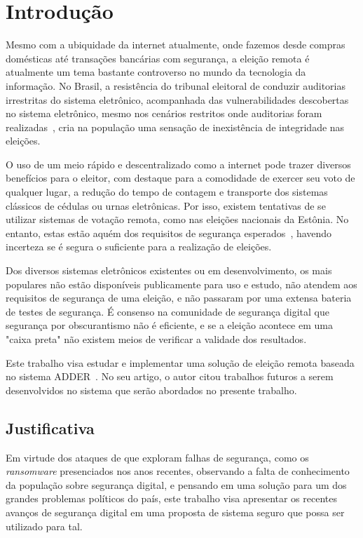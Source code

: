 

\chapter{Introdução}

Mesmo com a ubiquidade da internet atualmente, onde fazemos desde compras domésticas até transações bancárias com segurança, a eleição remota é atualmente um tema bastante controverso no mundo da tecnologia da informação. No Brasil, a resistência do tribunal eleitoral de conduzir auditorias irrestritas do sistema eletrônico, acompanhada das vulnerabilidades descobertas no sistema eletrônico, mesmo nos cenários restritos onde auditorias foram realizadas~\cite{aranhavulnerabilidades}, cria na população uma sensação de inexistência de integridade nas eleições.

O uso de um meio rápido e descentralizado como a internet pode trazer diversos benefícios para o eleitor, com destaque para a comodidade de exercer seu voto de qualquer lugar, a redução do tempo de contagem e transporte dos sistemas clássicos de cédulas ou urnas eletrônicas. Por isso, existem tentativas de se utilizar sistemas de votação remota, como nas eleições nacionais da Estônia. No entanto, estas estão aquém dos requisitos de segurança esperados~\cite{Springall:2014:SAE:2660267.2660315}, havendo incerteza se é segura o suficiente para a realização de eleições.

Dos diversos sistemas eletrônicos existentes ou em desenvolvimento, os mais populares não estão disponíveis publicamente para uso e estudo, não atendem aos requisitos de segurança de uma eleição, e não passaram por uma extensa bateria de testes de segurança. É consenso na comunidade de segurança digital que segurança por obscurantismo não é eficiente, e se a eleição acontece em uma "caixa preta" não existem meios de verificar a validade dos resultados.

Este trabalho visa estudar e implementar uma solução de eleição remota baseada no sistema ADDER~\cite{kiayias2006internet}. No seu artigo, o autor citou trabalhos futuros a serem desenvolvidos no sistema que serão abordados no presente trabalho.

\section{Justificativa}

Em virtude dos ataques de que exploram falhas de segurança, como os \textit{ransomware} presenciados nos anos recentes, observando a falta de conhecimento da população sobre segurança digital, e pensando em uma solução para um dos grandes problemas políticos do país, este trabalho visa apresentar os recentes avanços de segurança digital em uma proposta de sistema seguro que possa ser utilizado para tal.

